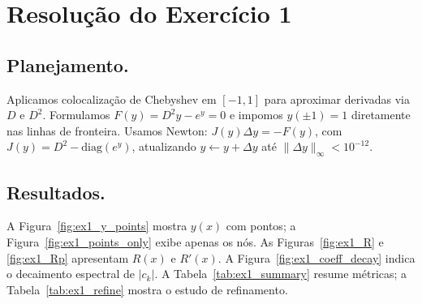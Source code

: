 \documentclass[12pt,a4paper]{article}
\begin{document}
\section{Resolução do Exercício 1}

\subsection{Planejamento.}
Aplicamos colocalização de Chebyshev em \([-1,1]\) para aproximar derivadas via \(D\) e \(D^2\).
Formulamos \(F(y)=D^2y-e^y=0\) e impomos \(y(\pm1)=1\) diretamente nas linhas de fronteira.
Usamos Newton: \(J(y)\Delta y=-F(y)\), com \(J(y)=D^2-\mathrm{diag}(e^y)\), atualizando \(y\leftarrow y+\Delta y\) até \(\|\Delta y\|_\infty<10^{-12}\).

\subsection{Resultados.}
A Figura~\ref{fig:ex1_y_points} mostra \(y(x)\) com pontos; a Figura~\ref{fig:ex1_points_only} exibe apenas os nós.
As Figuras~\ref{fig:ex1_R} e \ref{fig:ex1_Rp} apresentam \(R(x)\) e \(R'(x)\).
A Figura~\ref{fig:ex1_coeff_decay} indica o decaimento espectral de \(|c_k|\).
A Tabela~\ref{tab:ex1_summary} resume métricas; a Tabela~\ref{tab:ex1_refine} mostra o estudo de refinamento.
\end{document}
